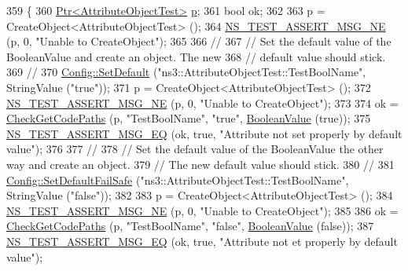 \begin{DoxyCode}
359 \{
360   \hyperlink{classns3_1_1Ptr}{Ptr<AttributeObjectTest>} \hyperlink{lte__link__budget_8m_ac9de518908a968428863f829398a4e62}{p};
361   \textcolor{keywordtype}{bool} ok;
362 
363   p = CreateObject<AttributeObjectTest> ();
364   \hyperlink{group__testing_ga73d66fb0050a5111453fd144e767b91a}{NS\_TEST\_ASSERT\_MSG\_NE} (p, 0, \textcolor{stringliteral}{"Unable to CreateObject"});
365 
366   \textcolor{comment}{//}
367   \textcolor{comment}{// Set the default value of the BooleanValue and create an object.  The new}
368   \textcolor{comment}{// default value should stick.}
369   \textcolor{comment}{//}
370   \hyperlink{group__config_ga2e7882df849d8ba4aaad31c934c40c06}{Config::SetDefault} (\textcolor{stringliteral}{"ns3::AttributeObjectTest::TestBoolName"}, StringValue (\textcolor{stringliteral}{"true"}));
371   p = CreateObject<AttributeObjectTest> ();
372   \hyperlink{group__testing_ga73d66fb0050a5111453fd144e767b91a}{NS\_TEST\_ASSERT\_MSG\_NE} (p, 0, \textcolor{stringliteral}{"Unable to CreateObject"});
373 
374   ok = \hyperlink{classAttributeTestCase_a902fb84c803f1c898329f9263575331e}{CheckGetCodePaths} (p, \textcolor{stringliteral}{"TestBoolName"}, \textcolor{stringliteral}{"true"}, 
      \hyperlink{classns3_1_1BooleanValue}{BooleanValue} (\textcolor{keyword}{true}));
375   \hyperlink{group__testing_ga2a9d78cffb3db8e867c35fff0b698cf5}{NS\_TEST\_ASSERT\_MSG\_EQ} (ok, \textcolor{keyword}{true}, \textcolor{stringliteral}{"Attribute not set properly by default value"});
376 
377   \textcolor{comment}{//}
378   \textcolor{comment}{// Set the default value of the BooleanValue the other way and create an object.}
379   \textcolor{comment}{// The new default value should stick.}
380   \textcolor{comment}{//}
381   \hyperlink{group__config_ga54361b707f31481b11d19f03495cb045}{Config::SetDefaultFailSafe} (\textcolor{stringliteral}{"ns3::AttributeObjectTest::TestBoolName"}, 
      StringValue (\textcolor{stringliteral}{"false"}));
382 
383   p = CreateObject<AttributeObjectTest> ();
384   \hyperlink{group__testing_ga73d66fb0050a5111453fd144e767b91a}{NS\_TEST\_ASSERT\_MSG\_NE} (p, 0, \textcolor{stringliteral}{"Unable to CreateObject"});
385 
386   ok = \hyperlink{classAttributeTestCase_a902fb84c803f1c898329f9263575331e}{CheckGetCodePaths} (p, \textcolor{stringliteral}{"TestBoolName"}, \textcolor{stringliteral}{"false"}, 
      \hyperlink{classns3_1_1BooleanValue}{BooleanValue} (\textcolor{keyword}{false}));
387   \hyperlink{group__testing_ga2a9d78cffb3db8e867c35fff0b698cf5}{NS\_TEST\_ASSERT\_MSG\_EQ} (ok, \textcolor{keyword}{true}, \textcolor{stringliteral}{"Attribute not et properly by default value"});

\end{DoxyCode}
